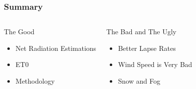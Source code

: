 \documentclass{beamer}
\begin{document}
\begin{frame}
   \frametitle<presentation>{Summary}
   \begin{columns}
     \begin{block}{The Good}
       \begin{itemize}
       \item Net Radiation Estimations
       \item \acf{ET0}
       \item Methodology
       \end{itemize}
     \end{block}
     \begin{block}{The Bad and The Ugly}
       \begin{itemize}
       \item Better Lapse Rates
       \item Wind Speed is Very Bad
       \item Snow and Fog
       \end{itemize}
     \end{block}
   \end{columns}
\end{frame}


\end{document}
